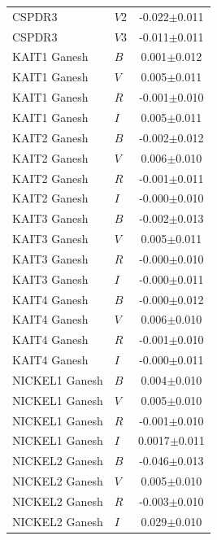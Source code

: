 {\begin{tabular}{llc}
     CSPDR3 &    $  V$2 &  -0.022$\pm$0.011 \\%
     CSPDR3 &    $  V$3 &  -0.011$\pm$0.011 \\%
    KAIT1 Ganesh &   $   B$ &   0.001$\pm$0.012 \\
    KAIT1 Ganesh &   $   V$ &   0.005$\pm$0.011 \\
    KAIT1 Ganesh &   $   R$ &  -0.001$\pm$0.010 \\
    KAIT1 Ganesh &   $   I$ &   0.005$\pm$0.011 \\
    KAIT2 Ganesh &   $   B$ &   -0.002$\pm$0.012 \\
    KAIT2 Ganesh &   $   V$ &   0.006$\pm$0.010 \\
    KAIT2 Ganesh &   $   R$ &   -0.001$\pm$0.011 \\
    KAIT2 Ganesh &   $   I$ &    -0.000$\pm$0.010 \\
    KAIT3 Ganesh &   $   B$ &  -0.002$\pm$0.013 \\
    KAIT3 Ganesh &   $   V$ &   0.005$\pm$0.011 \\
    KAIT3 Ganesh &   $   R$ &  -0.000$\pm$0.010 \\
    KAIT3 Ganesh &   $   I$ &  -0.000$\pm$0.011 \\
    KAIT4 Ganesh &   $   B$ &  -0.000$\pm$0.012 \\
    KAIT4 Ganesh &   $   V$ &     0.006$\pm$0.010 \\
    KAIT4 Ganesh &   $   R$ &    -0.001$\pm$0.010 \\
    KAIT4 Ganesh &   $   I$ &  -0.000$\pm$0.011 \\
  NICKEL1 Ganesh &   $   B$ &   0.004$\pm$0.010 \\
  NICKEL1 Ganesh &   $   V$ &   0.005$\pm$0.010 \\
  NICKEL1 Ganesh &   $   R$ &  -0.001$\pm$0.010 \\
  NICKEL1 Ganesh &   $   I$ &   0.0017$\pm$0.011 \\
  NICKEL2 Ganesh &   $   B$ &  -0.046$\pm$0.013 \\
  NICKEL2 Ganesh &   $   V$ &   0.005$\pm$0.010 \\
  NICKEL2 Ganesh &   $   R$ &  -0.003$\pm$0.010 \\
  NICKEL2 Ganesh &   $   I$ &   0.029$\pm$0.010 \\


\hline

\end{tabular}


}
